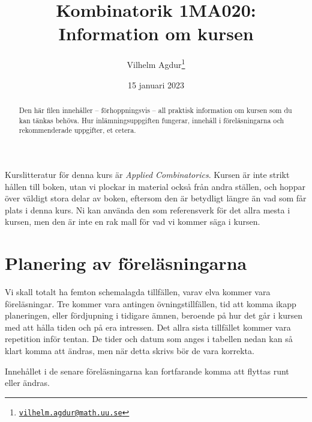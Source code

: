 \documentclass{tufte-handout}
\title{Kombinatorik 1MA020: Information om kursen}
\author[Vilhelm Agdur]{Vilhelm Agdur\thanks{\href{mailto:vilhelm.agdur@math.uu.se}{\nolinkurl{vilhelm.agdur@math.uu.se}}}}
\date{15 januari 2023}
\begin{document}
\maketitle%

\begin{abstract}
\noindent
Den här filen innehåller -- förhoppningsvis -- all praktisk information om kursen som du kan tänkas behöva. Hur inlämningsuppgiften fungerar, innehåll
i föreläsningarna och rekommenderade uppgifter, et cetera. 
\end{abstract}

Kurslitteratur för denna kurs är \emph{Applied Combinatorics}\cite{mainTextbook}. Kursen är inte strikt hållen till boken, utan vi plockar in material också från andra ställen, och hoppar över väldigt stora delar av boken, eftersom den är betydligt längre än vad som får plats i denna kurs. Ni kan använda den som referensverk för det allra mesta i kursen, men den är inte en rak mall för vad vi kommer säga i kursen.

\section{Planering av föreläsningarna}

Vi skall totalt ha femton schemalagda tillfällen, varav elva kommer vara föreläsningar. Tre kommer vara antingen övningstillfällen, tid att komma ikapp planeringen, eller fördjupning i tidigare ämnen, beroende på hur det går i kursen med att hålla tiden och på era intressen. Det allra sista tillfället kommer vara repetition inför tentan. De tider och datum som anges i tabellen nedan kan så klart komma att ändras, men när detta skrivs bör de vara korrekta.

Innehållet i de senare föreläsningarna kan fortfarande komma att flyttas runt eller ändras.
\end{document}
